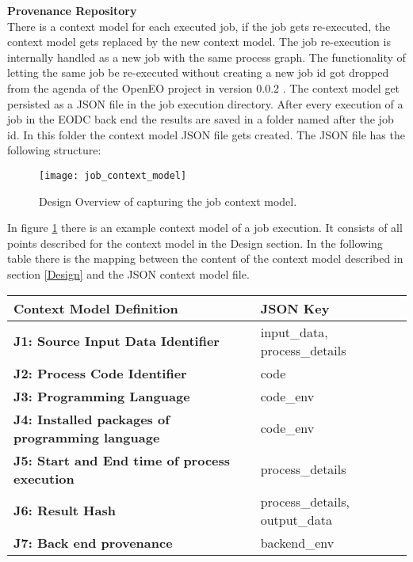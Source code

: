 \documentclass[draft,final]{vutinfth} %
\begin{document}
\textbf{Provenance Repository} \\
There is a context model for each executed job, if the job gets re-executed, the context model gets replaced by the new context model. The job re-execution is internally handled as a new job with the same process graph. The functionality of letting the same job be re-executed without creating a new job id got dropped from the agenda of the OpenEO project in version 0.0.2 \cite{openeo}. 
The context model get persisted as a JSON file in the job execution directory. After every execution of a job in the EODC back end the results are saved in a folder named after the job id. In this folder the context model JSON file gets created. The JSON file has the following structure:

\begin{figure}[h]
	\centering
	\texttt{[image: job\_context\_model]}
	\caption{Design Overview of capturing the job context model.}
	\label{fig:job_context_model} %
\end{figure}
In figure \ref{fig:job_context_model} there is an example context model of a job execution. It consists of all points described for the context model in the Design section. In the following table there is the mapping between the content of the context model described in section \ref{Design} and the JSON context model file. 

\begin{table}[]
	\begin{tabular}{l|l}
		\textbf{Context Model Definition} & \textbf{JSON Key} \\ \hline
		\textbf{J1:  Source Input Data Identifier} & input\_data, process\_details \\ \hline
		\textbf{J2: Process Code Identifier} & code \\ \hline
		\textbf{J3: Programming Language} & code\_env \\ \hline
		\textbf{J4: Installed packages of programming language} & code\_env \\ \hline
		\textbf{J5: Start and End time of process execution} & process\_details \\ \hline
		\textbf{J6: Result Hash} & process\_details, output\_data \\ \hline
		\textbf{J7: Back end provenance} & backend\_env \\ 
	\end{tabular}
\end{table}
\end{document}
